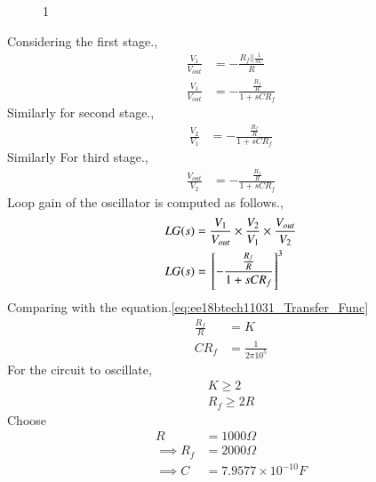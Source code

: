 \begin{enumerate}[label=\thesubsection.\arabic*.,ref=\thesubsection.\theenumi]
\begin{figure}[!hbt]
\begin{center}
	\end{center}
\caption{1}
\label{fig:ee18btech11031_circuit_design}
\end{figure}
Considering the first stage.,
\begin{align}
    \frac{V_1}{V_{out}} &= -\frac{R_f||\frac{1}{sC}}{R}\\
    \frac{V_1}{V_{out}} &= -\frac{\frac{R_f}{R}}{1+sCR_f}
\end{align}
Similarly for second stage.,
\begin{align}
     \frac{V_2}{V_1} &= -\frac{\frac{R_f}{R}}{1+sCR_f}
\end{align}
Similarly For third stage.,
\begin{align}
     \frac{V_{out}}{V_2} &= -\frac{\frac{R_f}{R}}{1+sCR_f}
\end{align}
Loop gain of the oscillator is computed as follows.,
\begin{align}
    LG(s) &= \frac{V_1}{V_{out}}\times \frac{V_2}{V_1}\times \frac{V_{out}}{V_2} \\
    LG(s) &= {}\left[-\frac{\frac{R_f}{R}}{1+sCR_f}\right]^3
\end{align}
Comparing with the equation.\ref{eq:ee18btech11031_Transfer_Func}
\begin{align}
    \frac{R_f}{R} &= K\\
    CR_f &= \frac{1}{2\pi10^5}
\end{align}
For the circuit to oscillate,
\begin{align}
  K \geq 2 \\
  R_f \geq 2R
\end{align}
Choose 
\begin{align}
    R &= 1000\Omega\\
    \implies R_f &= 2000\Omega\\
    \implies C &= 7.9577\times 10^{-10}F
\end{align}
\begin{table}[!ht]
\centering

\caption{}
\label{table:Output_table}
\end{table}
\end{enumerate}

